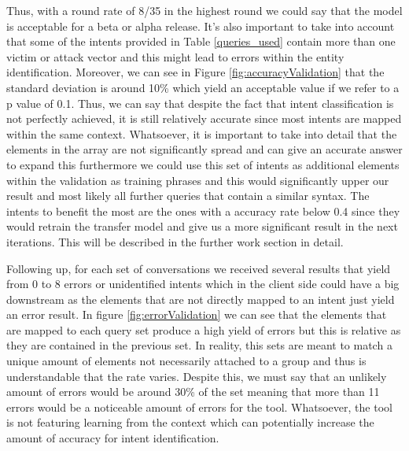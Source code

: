 Thus, with a round rate of 8/35 in the highest round we could say that the model is acceptable for a beta or alpha release. It's also important to take into account that some of the intents provided in Table \ref{queries_used} contain more than one victim or attack vector and this might lead to errors within the entity identification. Moreover, we can see in Figure \ref{fig:accuracyValidation} that the standard deviation is around 10\% which yield an acceptable value if we refer to a p value of 0.1. Thus, we can say that despite the fact that intent classification is not perfectly achieved, it is still relatively accurate since most intents are mapped within the same context. Whatsoever, it is important to take into detail that the elements in the array are not significantly spread and can give an accurate answer to expand this furthermore we could use this set of intents as additional elements within the validation as training phrases and this would significantly upper our result and most likely all further queries that contain a similar syntax. The intents to benefit the most are the ones with a accuracy rate below 0.4 since they would retrain the transfer model and give us a more significant result in the next iterations. This will be described in the further work section in detail.

Following up, for each set of conversations we received several results that yield from 0 to 8 errors or unidentified intents which in the client side could have a big downstream as the elements that are not directly mapped to an intent just yield an error result. In figure \ref{fig:errorValidation} we can see that the elements that are mapped to each query set produce a high yield of errors but this is relative as they are contained in the previous set. In reality, this sets are meant to match a unique amount of elements not necessarily attached to a group and thus is understandable that the rate varies. Despite this, we must say that an unlikely amount of errors would be around 30\% of the set meaning that more than 11 errors would be a noticeable amount of errors for the tool. Whatsoever, the tool is not featuring learning from the context which can potentially increase the amount of accuracy for intent identification.

